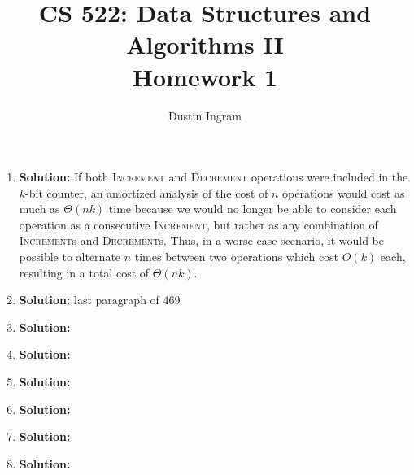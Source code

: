 \documentclass{article}
\title{CS 522: Data Structures and Algorithms II \\ Homework 1}
\author{Dustin Ingram}
\begin{document}
\maketitle
\begin{enumerate}
    \item \textbf{Solution:}
    If both \textsc{Increment} and \textsc{Decrement} operations were included
    in the $k$-bit counter, an amortized analysis of the cost of $n$ operations
    would cost as much as $\Theta(nk)$ time because we would no longer be able
    to consider each operation as a consecutive \textsc{Increment}, but rather
    as any combination of \textsc{Increment}s and \textsc{Decrement}s. Thus, in
    a worse-case scenario, it would be possible to alternate $n$ times between
    two operations which cost $O(k)$ each, resulting in a total cost of
    $\Theta(nk)$.

    \item \textbf{Solution:}
    last paragraph of 469

    \item \textbf{Solution:}

    \item \textbf{Solution:}

    \item \textbf{Solution:}

    \item \textbf{Solution:}

    \item \textbf{Solution:}

    \item \textbf{Solution:}
\end{enumerate}
\end{document}
